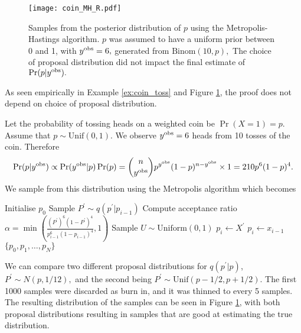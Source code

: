 \begin{figure}[htbp]
    \centering
    \texttt{[image: coin\_MH\_R.pdf]}
    \caption[{
        Metropolis-Hastings samples from the posterior distribution of $p,$ 
        for $y^\obs\sim\mathrm{Binom}(n, p)$
    }]{
        Samples from the posterior distribution of $p$ using the
        Metropolis-Hastings algorithm. $p$ was assumed to
        have a uniform prior between 0 and 1, with $y^{\mathrm{obs}} = 6,$ generated
        from $\mathrm{Binom}(10, p),$
        The choice of proposal distribution did not impact the final estimate
        of $\Pr(p | y^{\mathrm{obs}}).$
    }
    \label{fig:coin_R}
\end{figure}

As seen empirically in Example \ref{ex:coin_toss} and Figure \ref{fig:coin_R}, 
the proof does not depend on choice of proposal distribution.

\begin{example}\label{ex:coin_toss}
    Let the probability of tossing heads on a weighted coin be
    $\Pr(X = 1) = p.$ Assume that $p\sim \mathrm{Unif}(0,1).$
    We observe $y^{\mathrm{obs}} = 6$ heads from 10 tosses of the coin.
    Therefore
    $$
        \Pr(p | y^{\mathrm{obs}}) \propto \Pr(y^{\mathrm{obs}}| p)\Pr(p)
        = \binom{n}{y^{\mathrm{obs}}}p^{y^{\mathrm{obs}}}(1 - p)^{n - y^{\mathrm{obs}}}\times 1
        = 210p^6(1-p)^4.
    $$
    We sample from this distribution using the Metropolis algorithm which
    becomes
    \begin{algorithmic}
        \State Initialise $p_0$
        \State Sample $P^\prime \sim q(p^\prime|p_{i - 1})$
        \State Compute acceptance ratio
        $\alpha
            = \min\left(
            \frac{(P^\prime)^6(1-P^\prime)^4}{p_{i - 1}^6(1-p_{i - 1})^4}, 1
            \right)$ 
        \State Sample $U \sim \text{Uniform}(0, 1)$
        \State $p_i \gets X^\prime$
        \Else
        \State $p_i \gets x_{i - 1}$
        \EndIf
        \EndFor
        \State \Return $\{p_0, p_1, \dots, p_N\}$
    \end{algorithmic}

    We can compare two
    different proposal distributions for $q(p^\prime | p)$,
    $P^\prime \sim N(p, 1/12),$ and
    the second being $P^\prime \sim \mathrm{Unif}(p - 1/2, p + 1/2).$ The first
    1000 samples were discarded as burn in, and it was thinned to every 5
    samples.
    The resulting distribution of the samples can be seen in Figure
    \ref{fig:coin_R}, with both proposal distributions resulting in samples
    that are good at estimating the true distribution.
\end{example}

